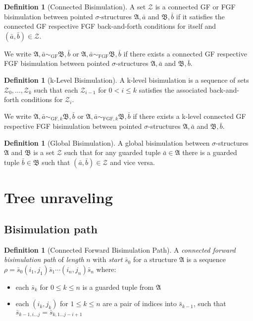 \documentclass{scrartcl}
\theoremstyle{definition}
\newtheorem{definition}[theorem]{Definition}
\newcommand{\struct}[1]{$\mathfrak{#1}$}
\begin{document}
\begin{definition}[Connected Bisimulation]
A set $\mathcal{Z}$ is a connected GF or FGF bisimulation between pointed $\sigma$-structures $\mathfrak{A}, \bar{a}$ and $\mathfrak{B}, \bar{b}$ if it satisfies the connected GF respective FGF back-and-forth conditions for itself and $(\bar{a}, \bar{b}) \in \mathcal{Z}$.
\end{definition}

We write $\mathfrak{A}, \bar{a} \sim_{\textrm{GF}} \mathfrak{B}, \bar{b}$ or $\mathfrak{A}, \bar{a} \sim_{\textrm{FGF}} \mathfrak{B}, \bar{b}$ if there exists a connected GF respective FGF bisimulation between pointed $\sigma$-structures $\mathfrak{A}, \bar{a}$ and $\mathfrak{B}, \bar{b}$.

\begin{definition}[k-Level Bisimulation]
A k-level bisimulation is a sequence of sets $\mathcal{Z}_0, \ldots, \mathcal{Z}_k$ such that each $\mathcal{Z}_{i - 1}$ for $0 < i \le k$ satisfies the associated back-and-forth conditions for $\mathcal{Z}_i$.
\end{definition}

We write $\mathfrak{A}, \bar{a} \sim_{\textrm{GF}, k} \mathfrak{B}, \bar{b}$ or $\mathfrak{A}, \bar{a} \sim_{\textrm{FGF}, k} \mathfrak{B}, \bar{b}$ if there exists a k-level connected GF respective FGF bisimulation between pointed $\sigma$-structures $\mathfrak{A}, \bar{a}$ and $\mathfrak{B}, \bar{b}$.

\begin{definition}[Global Bisimulation]
A global bisimulation between $\sigma$-structures $\mathfrak{A}$ and $\mathfrak{B}$ is a set $\mathcal{Z}$ such that for any guarded tuple $\bar{a} \in \mathfrak{A}$ there is a guarded tuple $\bar{b} \in \mathfrak{B}$ such that $(\bar{a}, \bar{b}) \in \mathcal{Z}$ and vice versa.
\end{definition}

\pagebreak

\section{Tree unraveling}

\subsection{Bisimulation path}

\begin{definition}[Connected Forward Bisimulation Path]\label{def:bisim-path}
  A \emph{connected forward bisimulation path} of \emph{length} $n$ with \emph{start} $\bar{s}_{0}$ for a structure \struct{A} is a sequence $\rho = \bar{s}_{0}(i_{1}, j_{1})\bar{s}_{1}\cdots{}(i_{n}, j_{n})\bar{s}_{n}$ where:
  \begin{itemize}
    \item each $\bar{s}_{k}$ for $0 \le k \le n$ is a guarded tuple from \struct{A}
    \item each $(i_{k}, j_{k})$ for $1 \le k \le n$ are a pair of indices into $\bar{s}_{k-1}$, such that $\bar{s}_{k-1,i\ldots{}j} = \bar{s}_{k,1\ldots{j-i+1}}$
  \end{itemize}
\end{definition}
\end{document}
